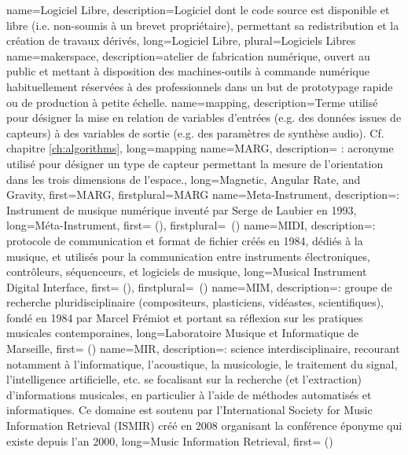 {
    name={Logiciel Libre},
    description={Logiciel dont le code source est disponible et libre (i.e. non-soumis à un brevet propriétaire), permettant sa redistribution et la création de travaux dérivés},
    long={Logiciel Libre},
    plural={Logiciels Libres}
}
{
    name={makerspace},
    description={atelier de fabrication numérique, ouvert au public et mettant à disposition des machines-outils à commande numérique habituellement réservées à des professionnels dans un but de prototypage rapide ou de production à petite échelle.}
}
{
    name={mapping},
    description={Terme utilisé pour désigner la mise en relation de variables d'entrées (e.g. des données issues de capteurs) à des variables de sortie (e.g. des paramètres de synthèse audio). Cf. chapitre \ref{ch:algorithms}},
    long={mapping}
}
{
    name={MARG},
    description={\textit{} : acronyme utilisé pour désigner un type de capteur permettant la mesure de l'orientation dans les trois dimensions de l'espace.},
    long={Magnetic, Angular Rate, and Gravity},
    first={MARG},
    firstplural={MARG}
}
{
    name={Meta-Instrument},
    description={\textit{}: Instrument de musique numérique inventé par Serge de Laubier en 1993},
    long={Méta-Instrument},
    first={ ()},
    firstplural={\glspluralsuffix\ (\glspluralsuffix)}
}
{
    name={MIDI},
    description={\textit{}: protocole de communication et format de fichier créés en 1984, dédiés à la musique, et utilisés pour la communication entre instruments électroniques, contrôleurs, séquenceurs, et logiciels de musique},
    long={Musical Instrument Digital Interface},
   	first={ ()},
    firstplural={\glspluralsuffix\ (\glspluralsuffix)}
}
{
    name={MIM},
    description={\textit{}: groupe de recherche pluridisciplinaire (compositeurs, plasticiens, vidéastes, scientifiques), fondé en 1984 par Marcel Frémiot et portant sa réflexion sur les pratiques musicales contemporaines},
    long={Laboratoire Musique et Informatique de Marseille},
    first={ ()}
}
{
    name={MIR},
    description={\textit{}: science interdisciplinaire, recourant notamment à l'informatique, l'acoustique, la musicologie, le traitement du signal, l'intelligence artificielle, etc. se focalisant sur la recherche (et l'extraction) d'informations musicales, en particulier à l'aide de méthodes automatisés et informatiques. Ce domaine est soutenu par l'International Society for Music Information Retrieval (ISMIR) créé en 2008 organisant la conférence éponyme qui existe depuis l'an 2000},
    long={Music Information Retrieval},
    first={ ()}
}
